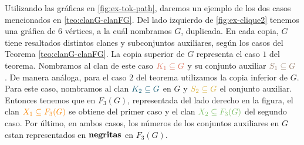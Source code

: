     Utilizando las gr\'aficas en \cref{fig:ex-tok-path}, daremos un ejemplo de
    los dos casos mencionados en \cref{teo:clanG-clanFG}. Del lado izquierdo de
    \cref{fig:ex-clique2} tenemos una gr\'afica de $6$ v\'ertices, a la cu\'al
    nombramos $G$, duplicada. En cada copia, $G$ tiene resaltados distintos
    clanes y subconjuntos auxiliares, seg\'un los casos del Teorema
    \ref{teo:clanG-clanFG}. La copia superior de $G$ representa el caso $1$ del
    teorema. Nombramos al clan de este caso ${\color{salmon}K_1 \subseteq G}$ y
    su conjunto auxiliar ${\color{baige}S_1\subseteq G}$ . De manera an\'aloga,
    para el caso $2$ del teorema utilizamos la copia inferior de $G$. Para este
    caso, nombramos al clan ${\color{azulOscuro}K_2\subseteq G}$ en $G$ y
    ${\color{oro}S_2\subseteq G}$ el conjunto auxiliar. Entonces tenemos que en
    $F_3(G)$, representada del lado derecho en la figura, el clan
    ${\color{naranja}X_1\subseteq F_3(G)}$ se obtiene del primer caso y el clan
    ${\color{verde}X_2 \subseteq F_3(G)}$ del segundo caso. Por \'ultimo, en
    ambos casos, los n\'umeros de los conjuntos auxiliares en $G$ estan
    representados en ${\bf negritas}$ en $F_3(G)$.

